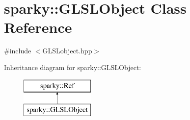 \hypertarget{classsparky_1_1_g_l_s_l_object}{}\section{sparky\+:\+:G\+L\+S\+L\+Object Class Reference}
\label{classsparky_1_1_g_l_s_l_object}


{\ttfamily \#include $<$G\+L\+S\+Lobject.\+hpp$>$}

Inheritance diagram for sparky\+:\+:G\+L\+S\+L\+Object\+:\begin{figure}[H]
\begin{center}
\leavevmode
\includegraphics[height=2.000000cm]{classsparky_1_1_g_l_s_l_object}
\end{center}
\end{figure}
